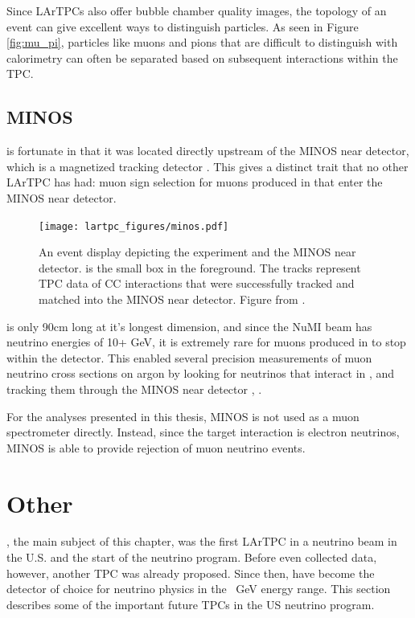 Since LArTPCs also offer bubble chamber quality images, the topology of an event can give excellent ways to distinguish particles.  As seen in Figure \ref{fig:mu_pi}, particles like muons and pions that are difficult to distinguish with calorimetry can often be separated based on subsequent interactions within the TPC.



\subsection{MINOS}

\argoneut is fortunate in that it was located directly upstream of the MINOS near detector, which is a magnetized tracking detector \cite{MINOS}.  This gives \argoneut a distinct trait that no other LArTPC has had: muon sign selection for muons produced in \argoneut that enter the MINOS near detector.

\begin{figure}[h]
  \centering
  \texttt{[image: lartpc\_figures/minos.pdf]}
  \caption[\argoneut and MINOS]{An event display depicting the \argoneut experiment and the MINOS near detector. \argoneut is the small box in the foreground.  The tracks represent TPC data of \numu CC interactions that were successfully tracked and matched into the MINOS near detector.  Figure from \cite{Anderson:2012vc}.}
  \label{fig:signal_shaping}
\end{figure}

\argoneut is only 90cm long at it's longest dimension, and since the NuMI beam has neutrino energies of 10+ GeV, it is extremely rare for muons produced in \argoneut to stop within the detector.  This enabled several precision measurements of muon neutrino cross sections on argon by looking for neutrinos that interact in \argoneut, and tracking them through the MINOS near detector \cite{Anderson:2011ce}, \cite{Acciarri:2014isz}.

For the analyses presented in this thesis, MINOS is not used as a muon spectrometer directly.  Instead, since the target interaction is electron neutrinos, MINOS is able to provide rejection of muon neutrino events.

\section{Other \lartpcs}

\argoneut, the main subject of this chapter, was the first LArTPC in a neutrino beam in the U.S. and the start of the \lartpc neutrino program.  Before \argoneut even collected data, however, another TPC was already proposed.  Since then, \lartpcs have become the detector of choice for neutrino physics in the ~GeV energy range.  This section describes some of the important future TPCs in the US neutrino program. 

